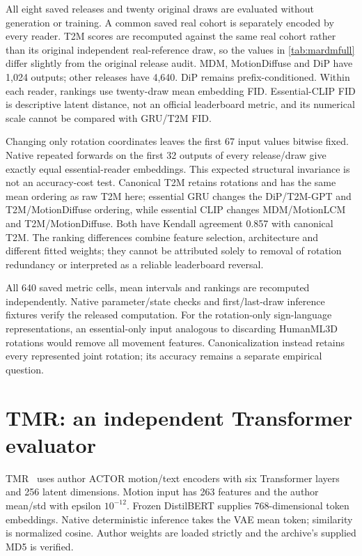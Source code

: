 \documentclass[10pt,twocolumn,letterpaper]{article}
\begin{document}
All eight saved releases and twenty original draws are evaluated without generation or training. A common saved real cohort is separately encoded by every reader. T2M scores are recomputed against the same real cohort rather than its original independent real-reference draw, so the values in \cref{tab:mardmfull} differ slightly from the original release audit. MDM, MotionDiffuse and DiP have 1,024 outputs; other releases have 4,640. DiP remains prefix-conditioned. Within each reader, rankings use twenty-draw mean embedding FID. Essential-CLIP FID is descriptive latent distance, not an official leaderboard metric, and its numerical scale cannot be compared with GRU/T2M FID.

Changing only rotation coordinates leaves the first 67 input values bitwise fixed. Native repeated forwards on the first 32 outputs of every release/draw give exactly equal essential-reader embeddings. This expected structural invariance is not an accuracy-cost test. Canonical T2M retains rotations and has the same mean ordering as raw T2M here; essential GRU changes the DiP/T2M-GPT and T2M/MotionDiffuse ordering, while essential CLIP changes MDM/MotionLCM and T2M/MotionDiffuse. Both have Kendall agreement 0.857 with canonical T2M. The ranking differences combine feature selection, architecture and different fitted weights; they cannot be attributed solely to removal of rotation redundancy or interpreted as a reliable leaderboard reversal.

All 640 saved metric cells, mean intervals and rankings are recomputed independently. Native parameter/state checks and first/last-draw inference fixtures verify the released computation. For the rotation-only sign-language representations, an essential-only input analogous to discarding HumanML3D rotations would remove all movement features. Canonicalization instead retains every represented joint rotation; its accuracy remains a separate empirical question.


\section{TMR: an independent Transformer evaluator}

TMR~\cite{tmr2023} uses author ACTOR motion/text encoders with six Transformer layers and 256 latent dimensions. Motion input has 263 features and the author mean/std with epsilon $10^{-12}$. Frozen DistilBERT supplies 768-dimensional token embeddings. Native deterministic inference takes the VAE mean token; similarity is normalized cosine. Author weights are loaded strictly and the archive's supplied MD5 is verified.
\end{document}
